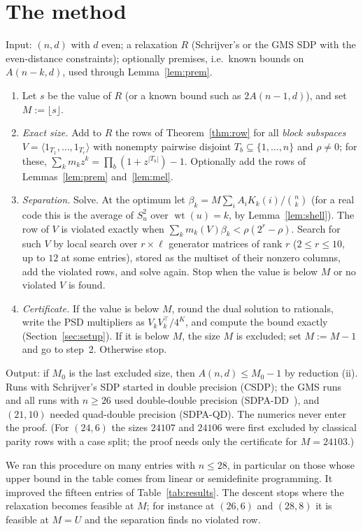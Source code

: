 \documentclass[11pt]{article}
\theoremstyle{remark}
\DeclareMathOperator{\wt}{wt}
\begin{document}
\section{The method}\label{sec:method}

Input: $(n,d)$ with $d$ even; a relaxation $R$ (Schrijver's or the GMS SDP with the even-distance constraints);
optionally premises, i.e.\ known bounds on $A(n-k,d)$, used through Lemma~\ref{lem:prem}.
\begin{enumerate}
\item Let $s$ be the value of $R$ (or a known bound such as $2A(n-1,d)$), and set $M:=\lfloor s\rfloor$.
\item \emph{Exact size.} Add to $R$ the rows of Theorem~\ref{thm:row} for all \emph{block subspaces}
$V=\langle 1_{T_1},\dots,1_{T_r}\rangle$ with nonempty pairwise disjoint $T_b\subseteq\{1,\dots,n\}$ and $\rho\ne0$;
for these, $\sum_k m_kz^k=\prod_b(1+z^{|T_b|})-1$. Optionally add the rows of Lemmas~\ref{lem:prem} and~\ref{lem:mel}.
\item \emph{Separation.} Solve. At the optimum let $\beta_k=M\sum_iA_iK_k(i)/\binom nk$ (for a real code this is the
average of $S_u^2$ over $\wt(u)=k$, by Lemma~\ref{lem:shell}). The row of $V$ is violated exactly when $\sum_km_k(V)\beta_k<\rho(2^r-\rho)$.
Search for such $V$ by local search over $r\times\ell$ generator matrices of rank $r$ ($2\le r\le10$, up to $12$ at
some entries), stored as the multiset of their nonzero columns, add the violated rows, and solve again. Stop when the value is below $M$ or no violated $V$
is found.
\item \emph{Certificate.} If the value is below $M$, round the dual solution to rationals, write the PSD multipliers
as $V_kV_k^\top/4^K$, and compute the bound exactly (Section~\ref{sec:setup}). If it is below $M$, the size $M$ is excluded; set
$M:=M-1$ and go to step~2. Otherwise stop.
\end{enumerate}
Output: if $M_0$ is the last excluded size, then $A(n,d)\le M_0-1$ by reduction (ii).
Runs with Schrijver's SDP started in double precision (CSDP); the GMS runs and all runs with $n\ge26$ used
double-double precision (SDPA-DD~\cite{Nak}), and $(21,10)$ needed quad-double precision (SDPA-QD). The numerics never
enter the proof. (For $(24,6)$ the sizes $24107$ and $24106$ were first excluded by classical parity rows with a case
split; the proof needs only the certificate for $M=24103$.)

We ran this procedure on many entries with $n\le28$, in particular on those whose upper bound in the table comes
from linear or semidefinite programming. It improved the fifteen entries of Table~\ref{tab:results}. The descent stops where the
relaxation becomes feasible at $M$; for instance at $(26,6)$ and $(28,8)$ it is feasible at $M=U$ and the
separation finds no violated row.
\end{document}
